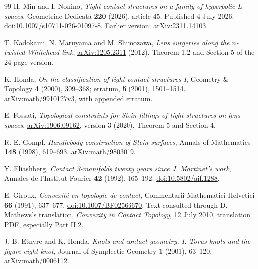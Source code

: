 \documentclass[12pt]{amsart}
\theoremstyle{definition}
\theoremstyle{remark}
\numberwithin{equation}{section}
\theoremstyle{definition}
\begin{document}
\renewcommand{\refname}{References}
\begin{thebibliography}{99}
H. Min and I. Nonino, \emph{Tight contact structures on a family of hyperbolic $L$-spaces}, Geometriae Dedicata \textbf{220} (2026), article 45. Published 4 July 2026. \href{https://doi.org/10.1007/s10711-026-01097-8}{doi:10.1007/s10711-026-01097-8}. Earlier version: \href{https://arxiv.org/abs/2311.14103}{arXiv:2311.14103}.

T. Kadokami, N. Maruyama and M. Shimozawa, \emph{Lens surgeries along the $n$-twisted Whitehead link}, \href{https://arxiv.org/abs/1205.2311}{arXiv:1205.2311} (2012). Theorem 1.2 and Section 5 of the 24-page version.

K. Honda, \emph{On the classification of tight contact structures I}, Geometry \& Topology \textbf{4} (2000), 309--368; erratum, \textbf{5} (2001), 1501--1514. \href{https://arxiv.org/abs/math/9910127}{arXiv:math/9910127v3}, with appended erratum.

E. Fossati, \emph{Topological constraints for Stein fillings of tight structures on lens spaces}, \href{https://arxiv.org/abs/1906.09162}{arXiv:1906.09162}, version 3 (2020). Theorem 5 and Section 4.

R. E. Gompf, \emph{Handlebody construction of Stein surfaces}, Annals of Mathematics \textbf{148} (1998), 619--693. \href{https://arxiv.org/abs/math/9803019}{arXiv:math/9803019}.

Y. Eliashberg, \emph{Contact 3-manifolds twenty years since J. Martinet's work}, Annales de l'Institut Fourier \textbf{42} (1992), 165--192. \href{https://doi.org/10.5802/aif.1288}{doi:10.5802/aif.1288}.

E. Giroux, \emph{Convexit\'e en topologie de contact}, Commentarii Mathematici Helvetici \textbf{66} (1991), 637--677. \href{https://doi.org/10.1007/BF02566670}{doi:10.1007/BF02566670}. Text consulted through D. Mathews's translation, \emph{Convexity in Contact Topology}, 12 July 2010, \href{https://few.vu.nl/~pasquott/Giroux-convexity.pdf}{translation PDF}, especially Part II.2.

J. B. Etnyre and K. Honda, \emph{Knots and contact geometry. I. Torus knots and the figure eight knot}, Journal of Symplectic Geometry \textbf{1} (2001), 63--120. \href{https://arxiv.org/abs/math/0006112}{arXiv:math/0006112}.


\end{thebibliography}
\end{document}

